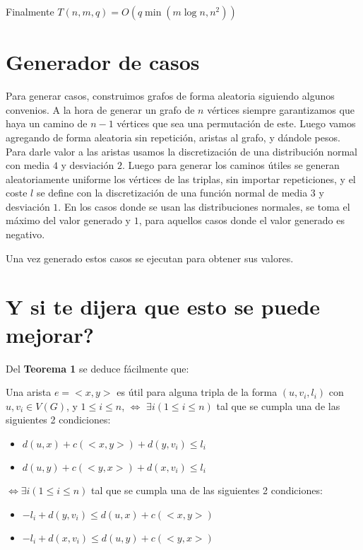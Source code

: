 \documentclass[a4paper]{article}
\begin{document}
	Finalmente $T(n,m,q) = O(q\min(m\log n, n^2))$
			
    \section*{Generador de casos}
    
    Para generar casos, construimos grafos de forma aleatoria siguiendo algunos convenios. A la hora de generar un grafo de $n$ vértices siempre garantizamos que haya un camino de $n-1$ vértices que sea una permutación de este. Luego vamos agregando de forma aleatoria sin repetición, aristas al grafo, y dándole pesos. Para darle valor a las aristas usamos la discretización de una distribución normal con media $4$ y desviación $2$. Luego para generar los caminos útiles se generan aleatoriamente uniforme los vértices de las triplas, sin importar repeticiones, y el coste $l$ se define con la discretización de una función normal de media $3$ y desviación $1$. En los casos donde se usan las distribuciones normales, se toma el máximo del valor generado y $1$, para aquellos casos donde el valor generado es negativo.
    
    Una vez generado estos casos se ejecutan para obtener sus valores.
    
    \section*{Y si te dijera que esto se puede mejorar?}
    
    Del \textbf{Teorema 1} se deduce fácilmente que:
    
    Una arista $e=<x,y>$ es útil para alguna tripla de la forma $(u,v_i,l_i)$ con $u,v_i \in V(G)$, y $1\le i \le n$, $\Leftrightarrow$ 
    $ \exists i (1\le i \le n)$ tal que se cumpla una de las siguientes 2 condiciones:
    \begin{itemize}
		\item $d(u,x) + c(<x,y>) + d(y,v_i) \le l_i$
		\item $d(u,y) + c(<y,x>) + d(x,v_i) \le l_i$
    \end{itemize}
	$\Leftrightarrow \exists i (1\le i \le n)$ tal que se cumpla una de las siguientes 2 condiciones:
    \begin{itemize}
    	\item $-l_i + d(y,v_i) \le d(u,x) + c(<x,y>)$
    	\item $-l_i + d(x,v_i) \le d(u,y) + c(<y,x>)$
    \end{itemize}
	
\end{document}
